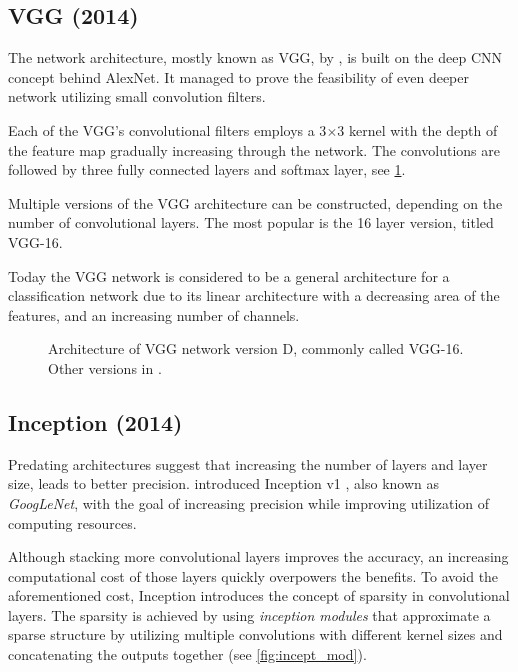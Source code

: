 \subsection{VGG (2014)}
\label{sec:VGG}
The network architecture, mostly known as VGG, by \citeauthor{bib:vgg} \cite{bib:vgg}, is built on the deep CNN concept behind AlexNet. It managed to prove the feasibility of even deeper network utilizing small convolution filters. 

Each of the VGG's convolutional filters employs a 3$\times$3 kernel with the depth of the feature map gradually increasing through the network. The convolutions are followed by three fully connected layers and softmax layer, see \cref{tab:vggarch}. 

Multiple versions of the VGG architecture can be constructed, depending on the number of convolutional layers. The most popular is the 16 layer version, titled VGG-16.

Today the VGG network is considered to be a general architecture for a classification network due to its linear architecture with a decreasing area of the features, and an increasing number of channels. 

\begin{figure}
    \centering
    \caption[VGG-16 architecture]%
    {Architecture of VGG network version D, commonly called VGG-16. Other versions in \cite[table 1]{bib:vgg}.}
    \label{tab:vggarch}
\end{figure}

\subsection{Inception (2014)}
\label{sec:inception}
Predating architectures suggest that increasing the number of layers and layer size, leads to better precision. \citeauthor{bib:googlenet} introduced Inception v1 \cite{bib:googlenet}, also known as \textit{GoogLeNet}, with the goal of increasing precision while improving utilization of computing resources.

Although stacking more convolutional layers improves the accuracy, an increasing computational cost of those layers quickly overpowers the benefits. To avoid the aforementioned cost, Inception introduces the concept of sparsity in convolutional layers. The sparsity is achieved by using \textit{inception modules} that approximate a sparse structure by utilizing multiple convolutions with different kernel sizes and concatenating the outputs together (see \cref{fig:incept_mod}). 

